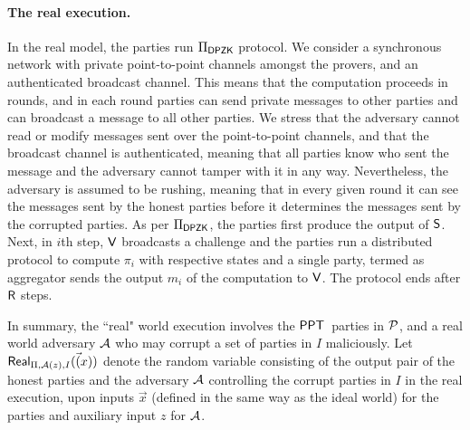 \paragraph{The real execution.} In the real model, the parties run $\Pi_{\mathsf{DPZK}}$ protocol.  We consider a synchronous network with private point-to-point channels amongst the provers, and an authenticated broadcast channel. This means that the computation proceeds in rounds, and in each round parties can send private messages to other parties and can broadcast a message to all other parties. We stress that the adversary cannot read or modify messages sent over the point-to-point channels, and that the broadcast channel is authenticated, meaning that all parties know who sent the message and the adversary cannot tamper with it in any way. Nevertheless, the adversary is assumed to be rushing, meaning that in every given round it can see the messages sent by the honest parties before it determines the messages sent by the corrupted parties. As per $\Pi_{\mathsf{DPZK}}$, the parties first produce the output of $\mathsf{S}$. Next, in $i$th step, $\mathsf{V}$ broadcasts a challenge and the  parties run a distributed protocol to compute $\pi_i$ with respective states and a single party, termed as aggregator sends the output $m_i$ of the computation to $\mathsf{V}$.  The protocol ends after $\mathsf{R}$ steps.

In summary,  the ``real" world execution involves the $\mathsf{PPT}$\ parties  in $\mathcal{P}$,  and a real world adversary $\mathcal{A}$ who may corrupt  a set of parties in $I$ maliciously.  Let $\mathsf{Real}_{\Pi, \mathcal{A}(z),I}(\vec(x))$ denote the random variable consisting of the output pair of the honest parties and the adversary $\mathcal{A}$ controlling the corrupt parties in $I$ in the real execution, upon inputs $\vec{x}$ (defined in the same way as the ideal world) for the parties and auxiliary input $z$ for $\mathcal{A}$. 


